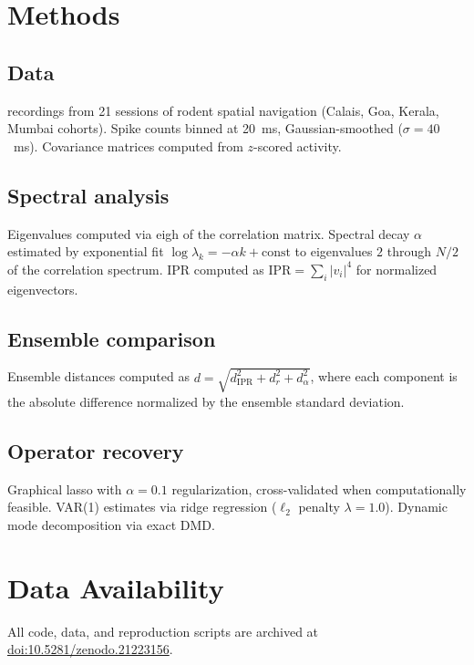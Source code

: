 \documentclass[aps,prf,reprint,twocolumn]{revtex4-2}
\newcommand{\mec}{\text{MEC}}
\begin{document}
\section{Methods}

\subsection{Data}

\mec{} recordings from 21 sessions of rodent spatial navigation (Calais, Goa, Kerala, Mumbai cohorts). Spike counts binned at 20~ms, Gaussian-smoothed ($\sigma = 40$~ms). Covariance matrices computed from $z$-scored activity.

\subsection{Spectral analysis}

Eigenvalues computed via eigh of the correlation matrix. Spectral decay $\alpha$ estimated by exponential fit $\log \lambda_k = -\alpha k + \text{const}$ to eigenvalues $2$ through $N/2$ of the correlation spectrum. IPR computed as $\text{IPR} = \sum_i |v_i|^4$ for normalized eigenvectors.

\subsection{Ensemble comparison}

Ensemble distances computed as $d = \sqrt{d_{\text{IPR}}^2 + d_r^2 + d_\alpha^2}$, where each component is the absolute difference normalized by the ensemble standard deviation.

\subsection{Operator recovery}

Graphical lasso with $\alpha = 0.1$ regularization, cross-validated when computationally feasible. VAR(1) estimates via ridge regression ($\ell_2$ penalty $\lambda = 1.0$). Dynamic mode decomposition via exact DMD.

\section*{Data Availability}

All code, data, and reproduction scripts are archived at \href{https://doi.org/10.5281/zenodo.21223156}{doi:10.5281/zenodo.21223156}.


\end{document}
